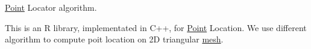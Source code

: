 \hyperlink{classPoint}{Point} Locator algorithm.

This is an R library, implementated in C++, for \hyperlink{classPoint}{Point} Location. We use different algorithm to compute poit location on 2D triangular \hyperlink{structmesh}{mesh}. 